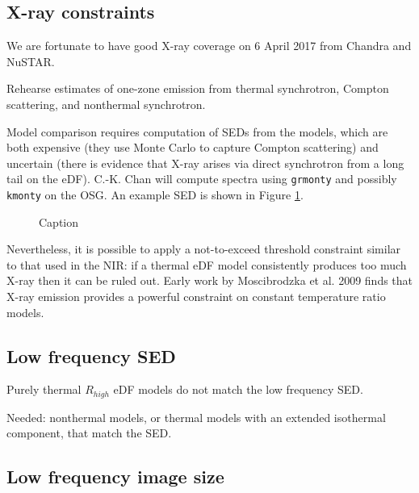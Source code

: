 \documentclass[twocolumn,tighten,dvipsnames]{aastex63}
\newcommand\<{{\langle}}
\renewcommand\>{{\rangle}} %
\begin{document}
\subsection{X-ray constraints}
\label{sec:xrayconst}

We are fortunate to have good X-ray coverage on 6 April 2017 from Chandra and NuSTAR.

Rehearse estimates of one-zone emission from thermal synchrotron, Compton scattering, and nonthermal synchrotron.

Model comparison requires computation of SEDs from the models, which are both expensive (they use Monte Carlo to capture Compton scattering) and uncertain (there is evidence that X-ray arises via direct synchrotron from a long tail on the eDF).  C.-K. Chan will compute spectra using {\tt grmonty} and possibly {\tt kmonty} on the OSG.  An example SED is shown in Figure \ref{fig:SEDexamp}.

\begin{figure}
    \centering
    \caption{Caption}
    \label{fig:SEDexamp}
\end{figure}

Nevertheless, it is possible to apply a not-to-exceed threshold constraint similar to that used in the NIR: if a thermal eDF model consistently produces too much X-ray then it can be ruled out.  Early work by Moscibrodzka et al. 2009 finds that X-ray emission provides a powerful constraint on constant temperature ratio models.

\subsection{Low frequency SED}
\label{sec:lfconst}

Purely thermal $R_{high}$ eDF models do not match the low frequency SED.

Needed: nonthermal models, or thermal models with an extended isothermal component, that match the SED.

\subsection{Low frequency image size}
\label{sec:lfsizeconst}
\end{document}
